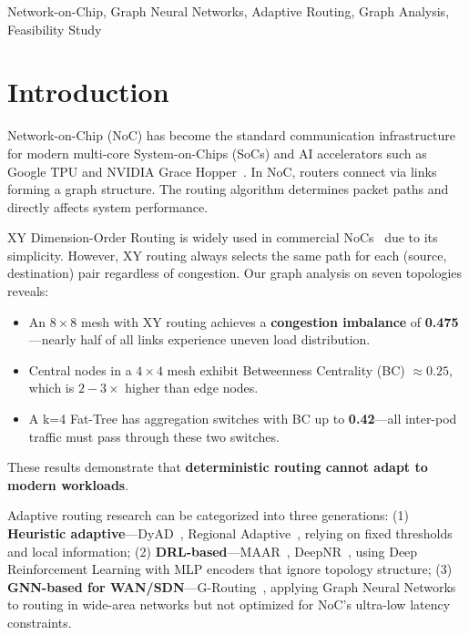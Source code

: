 \documentclass[conference]{IEEEtran}
\begin{document}
\begin{IEEEkeywords}
Network-on-Chip, Graph Neural Networks, Adaptive Routing, Graph Analysis, Feasibility Study
\end{IEEEkeywords}

\section{Introduction}
\label{sec:intro}

Network-on-Chip (NoC) has become the standard communication infrastructure for modern multi-core System-on-Chips (SoCs) and AI accelerators such as Google TPU and NVIDIA Grace Hopper~\cite{mirhoseini2021}. In NoC, routers connect via links forming a graph structure. The routing algorithm determines packet paths and directly affects system performance.

XY Dimension-Order Routing is widely used in commercial NoCs~\cite{wang2022maar} due to its simplicity. However, XY routing always selects the same path for each (source, destination) pair regardless of congestion. Our graph analysis on seven topologies reveals:

\begin{itemize}
 \item An $8\times8$ mesh with XY routing achieves a \textbf{congestion imbalance} of \textbf{0.475}---nearly half of all links experience uneven load distribution.
 \item Central nodes in a $4\times4$ mesh exhibit Betweenness Centrality (BC) $\approx 0.25$, which is $2-3\times$ higher than edge nodes.
 \item A k=4 Fat-Tree has aggregation switches with BC up to \textbf{0.42}---all inter-pod traffic must pass through these two switches.
\end{itemize}

These results demonstrate that \textbf{deterministic routing cannot adapt to modern workloads}.

Adaptive routing research can be categorized into three generations: (1) \textbf{Heuristic adaptive}---DyAD~\cite{dyad2004}, Regional Adaptive~\cite{ebrahimi2019}, relying on fixed thresholds and local information; (2) \textbf{DRL-based}---MAAR~\cite{wang2022maar}, DeepNR~\cite{deepnr2022}, using Deep Reinforcement Learning with MLP encoders that ignore topology structure; (3) \textbf{GNN-based for WAN/SDN}---G-Routing~\cite{g-routing2023}, applying Graph Neural Networks to routing in wide-area networks but not optimized for NoC's ultra-low latency constraints.
\end{document}
